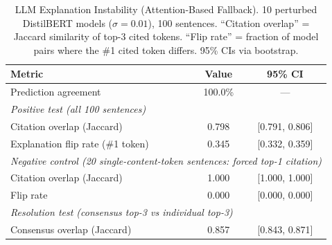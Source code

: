 \begin{table}[t]
\centering
\caption{LLM Explanation Instability (Attention-Based Fallback).
  10 perturbed DistilBERT models ($\sigma=0.01$), 100 sentences.
  ``Citation overlap'' = Jaccard similarity of top-3 cited tokens.
  ``Flip rate'' = fraction of model pairs where the \#1 cited token differs.
  95\% CIs via bootstrap.}
\label{tab:llm_explanation_instability}
\begin{tabular}{lcc}
\toprule
Metric & Value & 95\% CI \\
\midrule
Prediction agreement & 100.0\% & --- \\
\midrule
\multicolumn{3}{l}{\emph{Positive test (all 100 sentences)}} \\
Citation overlap (Jaccard) & 0.798 & [0.791, 0.806] \\
Explanation flip rate (\#1 token) & 0.345 & [0.332, 0.359] \\
\midrule
\multicolumn{3}{l}{\emph{Negative control (20 single-content-token sentences: forced top-1 citation)}} \\
Citation overlap (Jaccard) & 1.000 & [1.000, 1.000] \\
Flip rate & 0.000 & [0.000, 0.000] \\
\midrule
\multicolumn{3}{l}{\emph{Resolution test (consensus top-3 vs individual top-3)}} \\
Consensus overlap (Jaccard) & 0.857 & [0.843, 0.871] \\
\bottomrule
\end{tabular}
\end{table}
